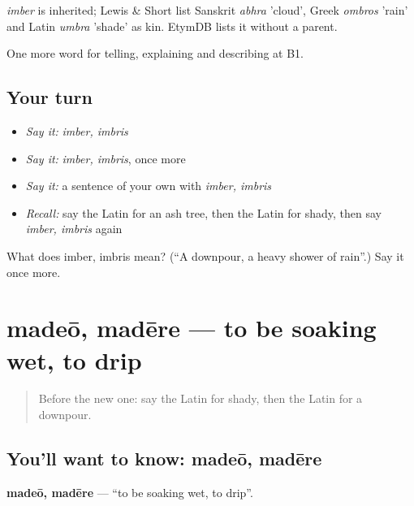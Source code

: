 \begin{cousinweb}
\emph{imber} is inherited; Lewis \& Short list Sanskrit \emph{abhra} 'cloud', Greek \emph{ombros} 'rain' and Latin \emph{umbra} 'shade' as kin. EtymDB lists it without a parent.
\end{cousinweb}

\begin{grammarlens}[title={What you've built}]
One more word for telling, explaining and describing at B1.
\end{grammarlens}

\subsection*{Your turn}
\begin{itemize}
\raggedright
  \item \emph{Say it:} \emph{imber, imbris}
  \item \emph{Say it:} \emph{imber, imbris}, once more
  \item \emph{Say it:} a sentence of your own with \emph{imber, imbris}
  \item \emph{Recall:} say the Latin for an ash tree, then the Latin for shady, then say \emph{imber, imbris} again
\end{itemize}

\begin{tcolorbox}[breakable,colback=teal!4,colframe=teal!35!black,title={Before you move on}]
What does imber, imbris mean? (\textquotedblleft{}A downpour, a heavy shower of rain\textquotedblright{}.) Say it once more.
\end{tcolorbox}
\section[madeō, madēre]{madeō, madēre — to be soaking wet, to drip}

\label{lesson:LA-C485-madeo}



\begin{quote}
Before the new one: say the Latin for shady, then the Latin for a downpour.
\end{quote}

\subsection*{You'll want to know: madeō, madēre}
\textbf{madeō, madēre} — \textquotedblleft{}to be soaking wet, to drip\textquotedblright{}.

